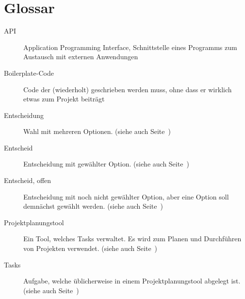 \chapter{Glossar}
	\begin{description}
		\item[API]{Application Programming Interface, Schnittstelle eines Programms zum Austausch mit externen Anwendungen}
		\item[Boilerplate-Code]{Code der (wiederholt) geschrieben werden muss, ohne dass er wirklich etwas zum Projekt beiträgt}
		\item[Entscheidung]{Wahl mit mehreren Optionen. (siehe auch Seite~\pageref{userstoryDefinitions})}
		\item[Entscheid]{Entscheidung mit gewählter Option. (siehe auch Seite~\pageref{userstoryDefinitions})}
		\item[Entscheid, offen]{Entscheidung mit noch nicht gewählter Option, aber eine Option soll demnächst gewählt werden. (siehe auch Seite~\pageref{userstoryDefinitions})}
		\item[Projektplanungstool]{Ein Tool, welches Tasks verwaltet. Es wird zum Planen und Durchführen von Projekten verwendet. (siehe auch Seite~\pageref{userstoryDefinitions})}
		\item[Tasks]{Aufgabe, welche üblicherweise in einem Projektplanungstool abgelegt ist. (siehe auch Seite~\pageref{userstoryDefinitions})}
	\end{description}